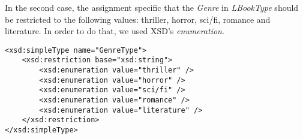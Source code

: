 In the second case, the assignment specific that the \emph{Genre} in
\emph{LBookType} should be restricted to the following values: thriller, horror,
sci/fi, romance and literature. In order to do that, we used XSD's
\emph{enumeration}.
\begin{lstlisting}
<xsd:simpleType name="GenreType">
    <xsd:restriction base="xsd:string">
        <xsd:enumeration value="thriller" />
        <xsd:enumeration value="horror" />
        <xsd:enumeration value="sci/fi" />
        <xsd:enumeration value="romance" />
        <xsd:enumeration value="literature" />
    </xsd:restriction>
</xsd:simpleType>
\end{lstlisting}


\newpage




